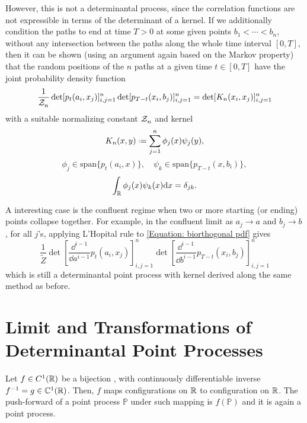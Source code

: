 However, this is not a determinantal process, since the correlation functions are not expressible in terms of the determinant of a kernel. If we additionally condition the paths to end at time $T > 0$ at some given points $b_1 < \cdots < b_n$, without any intersection between the paths along the whole time interval $[0, T ]$, then it can be shown (using an argument again based on the Markov property) that the random positions of the $n$ paths at a given time $t \in [0, T]$ have the joint probability density function
\begin{equation}
	\frac{1}{\mathcal{Z}_{n}^{}} \det[p_t(a_i, x_j)]_{i,j = 1}^{n} \det[p_{T-t}(x_i, b_j)]_{i,j = 1}^{n} = \det[K_n(x_i, x_j)]_{i,j = 1}^{n}
	\label{Equation: biorthogonal pdf}
\end{equation} 
with a suitable normalizing constant $\mathcal{Z}_{n}^{}$ and kernel
\begin{equation}
	K_n(x, y) \deff \sum_{j=1}^n \phi_j(x) \psi_j(y),
\end{equation}
\begin{equation}
	\phi_j \in \text{span}\{p_t(a_i, x)\}, \quad \psi_k \in \text{span}\{p_{T-t}(x, b_i)\},
\end{equation}
\begin{equation}
	\int_{\mathbb{R}} \phi_j(x) \psi_k(x) \mathrm{d} x = \delta_{jk}.
\end{equation}


A interesting case is the confluent regime when two or more starting (or ending) points collapse together. For example, in the confluent limit as $a_j \rightarrow a$ and $b_j \rightarrow b$, for all $j$’s, applying L’Hopital rule to \eqref{Equation: biorthogonal pdf} gives
\begin{equation}
	\frac{1}{\tilde{Z}}  \det\left[\frac{\dd^{i-1}}{\dd a^{i-1}} p_t(a_i, x_j)\right]_{i,j = 1}^{n} \det\left[\frac{\dd^{i-1}}{\dd b^{i-1}} p_{T-t}(x_i, b_j)\right]_{i,j = 1}^{n} 
\end{equation}
which is still a determinantal point process with kernel derived along the same method as before.

\section{Limit and Transformations of Determinantal Point Processes}

Let $f \in C^1(\mathbb{R})$ be a bijection , with continuously differentiable inverse $f^{-1} = g \in \mathbb{C}^1(\mathbb{R})$. Then, $f$ maps configurations on $\mathbb{R}$ to configuration on $\mathbb{R}$. The push-forward of a point process $\mathbb{P}$ under such mapping is $f(\mathbb{P})$ and it is again a point process.

